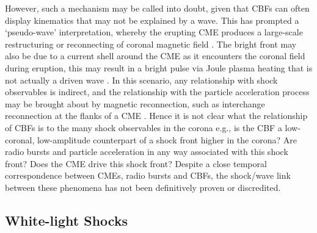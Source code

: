 However, such a mechanism may be called into doubt, given that CBFs can often display kinematics that may not be explained by a wave. This has prompted a `pseudo-wave' interpretation, whereby the erupting CME produces a large-scale restructuring or reconnecting of coronal magnetic field \citep{chen2002, attrill2007}. The bright front may also be due to a current shell around the CME as it encounters the coronal field during eruption, this may result in a bright pulse via Joule plasma heating that is not actually a driven wave \citep{delannee2008}. In this scenario, any relationship with shock observables is indirect, and the relationship with the particle acceleration process may be brought about by magnetic reconnection, such as interchange reconnection at the flanks of a CME \citep{maia2004}. Hence it is not clear what the relationship of CBFs is to the many shock observables in the corona e.g., is the CBF a low-coronal, low-amplitude counterpart of a shock front higher in the corona? Are radio bursts and particle acceleration in any way associated with this shock front? Does the CME drive this shock front? Despite a close temporal correspondence between CMEs, radio bursts and CBFs, the shock/wave link between these phenomena has not been definitively proven or discredited.

\subsection{White-light Shocks}

